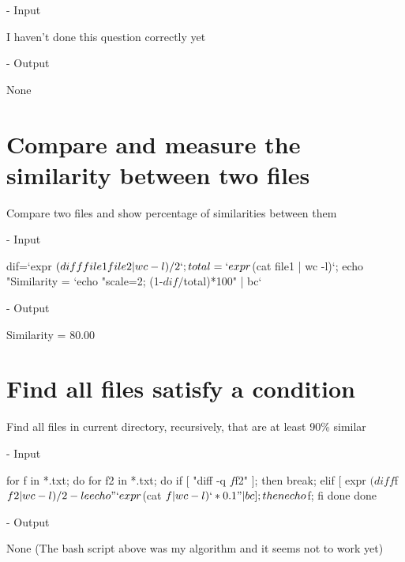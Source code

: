 \documentclass[10pt, a4paper]{article}
\begin{document}
\noindent - Input

\begin{verbbox}
I haven't done this question correctly yet
\end{verbbox}

\fbox{
\theverbbox
}

\noindent - Output

\begin{verbbox}
None
\end{verbbox}

\fbox{
\theverbbox
}

\section{Compare and measure the similarity between two files}

Compare two files and show percentage of similarities between them

\noindent - Input

\begin{verbbox}
dif=`expr $(diff file1 file2 | wc -l) / 2`; total=`expr $(cat file1 | wc -l)`; 
echo "Similarity = `echo "scale=2; (1-$dif/$total)*100" | bc` %
\end{verbbox}

\fbox{
\theverbbox
}

\noindent - Output

\begin{verbbox}
Similarity = 80.00 %
\end{verbbox}

\fbox{
\theverbbox
}

\section{Find all files satisfy a condition}

Find all files in current directory, recursively, that are at least 90\% similar

\noindent - Input

\begin{verbbox}
for f in *.txt; do 
    for f2 in *.txt; do 
        if [ "diff -q $f $f2" ]; then 
            break; 
        elif [ expr $(diff $f $f2 | wc -l) / 2 -le 
                                    echo "`expr $(cat $f | wc -l)` * 0.1" | bc ]; then
            echo $f; 
        fi 
    done 
done
\end{verbbox}

\fbox{
\theverbbox
}

\noindent - Output

\begin{verbbox}
None (The bash script above was my algorithm and it seems not to work yet)
\end{verbbox}

\fbox{
\theverbbox
}
\end{document}
